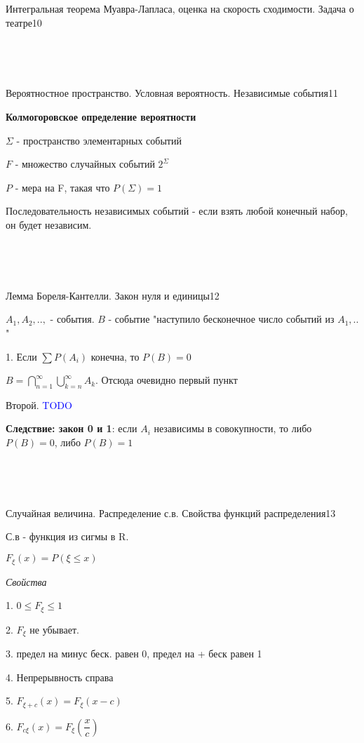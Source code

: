 \documentclass{article}
\begin{document}
\begin{question}{Интегральная теорема Муавра-Лапласа, оценка на скорость сходимости. Задача о театре}{10}

\end{question}

~\

~\

\begin{question}{Вероятностное пространство. Условная вероятность. Независимые события}{11}

\textbf{Колмогоровское определение вероятности}

$\Sigma$ - пространство элементарных событий

$F$ - множество случайных событий $2^\Sigma$

$P$ - мера на F, такая что $P(\Sigma) = 1$

Последовательность независимых событий - если взять любой конечный набор, он будет независим.

\end{question}

~\

~\

\begin{question}{Лемма Бореля-Кантелли. Закон нуля и единицы}{12}

$A_1, A_2, ..,$ - события. $B$ - событие "наступило бесконечное число событий из $A_1, ..$"

1. Если $\sum{P(A_i)}$ конечна, то $P(B) = 0$

$B = \bigcap_{n = 1}^\infty{\bigcup_{k = n}^\infty{A_k}}$. Отсюда очевидно первый пункт

Второй. \textcolor{blue}{TODO}

\textbf{Следствие: закон 0 и 1}: если $A_i$ независимы в совокупности, то либо $P(B) = 0$, либо $P(B) = 1$

\end{question}

~\

~\

\begin{question}{Случайная величина. Распределение с.в. Свойства функций распределения}{13}

С.в - функция из сигмы в R.

$F_\xi(x) = P(\xi \leq x)$

\textit{Свойства}

1. $0 \leq F_\xi \leq 1$

2. $F_\xi$ не убывает.

3. предел на минус беск. равен 0, предел на + беск равен 1

4. Непрерывность справа

5. $F_{\xi + c}(x) = F_\xi(x - c)$

6. $F_{c \xi}(x) = F_{\xi}(\dfrac{x}{c})$

\end{question}
\end{document}
